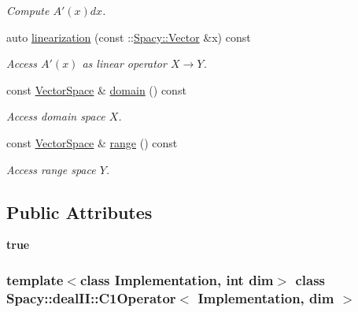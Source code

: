 \begin{DoxyCompactItemize}
\begin{DoxyCompactList}\small\item\em \-Compute $A'(x)dx$. \end{DoxyCompactList}\item 
auto \hyperlink{classSpacy_1_1dealII_1_1C1Operator_ae0d0fb25a4fbf8b402409f9f41dd4e8c}{linearization} (const \-::\hyperlink{classSpacy_1_1Vector}{\-Spacy\-::\-Vector} \&x) const 
\begin{DoxyCompactList}\small\item\em \-Access $A'(x)$ as linear operator $X\rightarrow Y$. \end{DoxyCompactList}\item 
\hypertarget{classSpacy_1_1OperatorBase_a2588f9b3e0188820c4c494e63293dc6f}{const \hyperlink{classSpacy_1_1VectorSpace}{\-Vector\-Space} \& \hyperlink{classSpacy_1_1OperatorBase_a2588f9b3e0188820c4c494e63293dc6f}{domain} () const }\label{classSpacy_1_1OperatorBase_a2588f9b3e0188820c4c494e63293dc6f}

\begin{DoxyCompactList}\small\item\em \-Access domain space $X$. \end{DoxyCompactList}\item 
\hypertarget{classSpacy_1_1OperatorBase_ab19d3b7a6f290b1079248f1e567e53d6}{const \hyperlink{classSpacy_1_1VectorSpace}{\-Vector\-Space} \& \hyperlink{classSpacy_1_1OperatorBase_ab19d3b7a6f290b1079248f1e567e53d6}{range} () const }\label{classSpacy_1_1OperatorBase_ab19d3b7a6f290b1079248f1e567e53d6}

\begin{DoxyCompactList}\small\item\em \-Access range space $Y$. \end{DoxyCompactList}\end{DoxyCompactItemize}
\subsection*{\-Public \-Attributes}
\begin{DoxyCompactItemize}
\item 
\hypertarget{classSpacy_1_1dealII_1_1C1Operator_ac77e3ed9e8163404cb43c04b9460a256}{{\bfseries true}}\label{classSpacy_1_1dealII_1_1C1Operator_ac77e3ed9e8163404cb43c04b9460a256}

\end{DoxyCompactItemize}
\subsubsection*{template$<$class Implementation, int dim$>$ class Spacy\-::deal\-I\-I\-::\-C1\-Operator$<$ Implementation, dim $>$}



